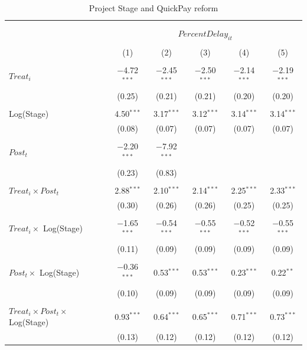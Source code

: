 \documentclass[
]{article}
\begin{document}
\begin{table}[H] \centering 
  \caption{Project Stage and QuickPay reform} 
  \label{} 
\small 
\begin{tabular}{@{\extracolsep{-2pt}}lccccc} 
\\[-1.8ex]\hline 
\hline \\[-1.8ex] 
\\[-1.8ex] & \multicolumn{5}{c}{$PercentDelay_{it}$  } \\ 
\\[-1.8ex] & (1) & (2) & (3) & (4) & (5)\\ 
\hline \\[-1.8ex] 
 $Treat_i$ & $-$4.72$^{***}$ & $-$2.45$^{***}$ & $-$2.50$^{***}$ & $-$2.14$^{***}$ & $-$2.19$^{***}$ \\ 
  & (0.25) & (0.21) & (0.21) & (0.20) & (0.20) \\ 
  & & & & & \\ 
 Log(Stage) & 4.50$^{***}$ & 3.17$^{***}$ & 3.12$^{***}$ & 3.14$^{***}$ & 3.14$^{***}$ \\ 
  & (0.08) & (0.07) & (0.07) & (0.07) & (0.07) \\ 
  & & & & & \\ 
 $Post_t$ & $-$2.20$^{***}$ & $-$7.92$^{***}$ &  &  &  \\ 
  & (0.23) & (0.83) &  &  &  \\ 
  & & & & & \\ 
 $Treat_i \times Post_t$ & 2.88$^{***}$ & 2.10$^{***}$ & 2.14$^{***}$ & 2.25$^{***}$ & 2.33$^{***}$ \\ 
  & (0.30) & (0.26) & (0.26) & (0.25) & (0.25) \\ 
  & & & & & \\ 
 $Treat_i \times$ Log(Stage) & $-$1.65$^{***}$ & $-$0.54$^{***}$ & $-$0.55$^{***}$ & $-$0.52$^{***}$ & $-$0.55$^{***}$ \\ 
  & (0.11) & (0.09) & (0.09) & (0.09) & (0.09) \\ 
  & & & & & \\ 
 $Post_t \times$ Log(Stage) & $-$0.36$^{***}$ & 0.53$^{***}$ & 0.53$^{***}$ & 0.23$^{***}$ & 0.22$^{**}$ \\ 
  & (0.10) & (0.09) & (0.09) & (0.09) & (0.09) \\ 
  & & & & & \\ 
 $Treat_i \times Post_t \times$ Log(Stage) & 0.93$^{***}$ & 0.64$^{***}$ & 0.65$^{***}$ & 0.71$^{***}$ & 0.73$^{***}$ \\ 
  & (0.13) & (0.12) & (0.12) & (0.12) & (0.12) \\ 

\end{tabular}
\end{table}
\end{document}
